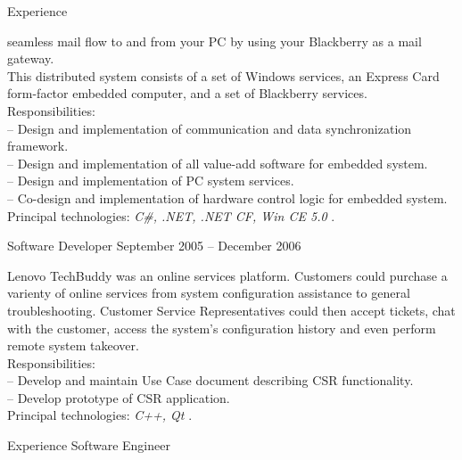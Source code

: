 \documentclass[letterpaper, 11pt]{article}
\begin{document}
\begin{resume}
\begin{category}{Experience}
\begin{block}
                seamless mail flow to and from your PC by using your Blackberry as a mail
                gateway.
                \\[1ex]
                This distributed system consists of a set of Windows services, an Express Card
                form-factor embedded computer, and a set of Blackberry services.
                \\[1ex]
                Responsibilities: \\
                -- Design and implementation of communication and data synchronization framework. \\
                -- Design and implementation of all value-add software for embedded system. \\
                -- Design and implementation of PC system services. \\
                -- Co-design and implementation of hardware control logic for embedded system.
                \\[1ex]
                Principal technologies: \emph{ C\#, .NET, .NET CF, Win CE 5.0 }.
                \smallskip
            \end{block}
            \begin{block}
                 {Software Developer}
                         { }                {September 2005 -- December 2006}
                \par
                Lenovo TechBuddy was an online services platform.  Customers could purchase
                a varienty of online services from system configuration assistance to general
                troubleshooting.  Customer Service Representatives could then accept tickets,
                chat with the customer, access the system's configuration history and even
                perform remote system takeover.
                \\[1ex]
                Responsibilities: \\
                -- Develop and maintain Use Case document describing CSR functionality. \\
                -- Develop prototype of CSR application.
                \\[1ex]
                Principal technologies: \emph{ C++, Qt }.
            \end{block}
        \end{category}
        \begin{category}{Experience}
                                                         {Software Engineer}

\end{category}
\end{resume}
\end{document}
